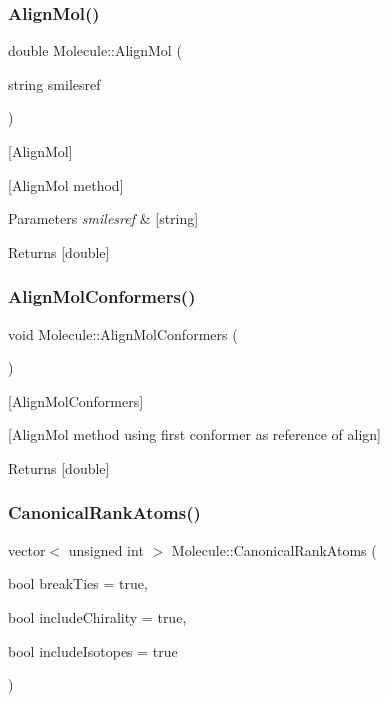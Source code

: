 \subsubsection{\texorpdfstring{Align\+Mol()}{AlignMol()}}
{\footnotesize\ttfamily double Molecule\+::\+Align\+Mol (\begin{DoxyParamCaption}\item[{string}]{smilesref }\end{DoxyParamCaption})}



\mbox{[}Align\+Mol\mbox{]} 

\mbox{[}Align\+Mol method\mbox{]}


\begin{DoxyParams}{Parameters}
{\em smilesref} & \mbox{[}string\mbox{]} \\
\hline
\end{DoxyParams}
\begin{DoxyReturn}{Returns}
\mbox{[}double\mbox{]} 
\end{DoxyReturn}
\mbox{\label{class_molecule_adc6886a60ec1e7f55ba07d7f2be72e68}} 
\subsubsection{\texorpdfstring{Align\+Mol\+Conformers()}{AlignMolConformers()}}
{\footnotesize\ttfamily void Molecule\+::\+Align\+Mol\+Conformers (\begin{DoxyParamCaption}{ }\end{DoxyParamCaption})}



\mbox{[}Align\+Mol\+Conformers\mbox{]} 

\mbox{[}Align\+Mol method using first conformer as reference of align\mbox{]}

\begin{DoxyReturn}{Returns}
\mbox{[}double\mbox{]} 
\end{DoxyReturn}
\mbox{\label{class_molecule_abc491241d48487fac42166ff81c0289c}} 
\subsubsection{\texorpdfstring{Canonical\+Rank\+Atoms()}{CanonicalRankAtoms()}}
{\footnotesize\ttfamily vector$<$ unsigned int $>$ Molecule\+::\+Canonical\+Rank\+Atoms (\begin{DoxyParamCaption}\item[{bool}]{break\+Ties = {\ttfamily true},  }\item[{bool}]{include\+Chirality = {\ttfamily true},  }\item[{bool}]{include\+Isotopes = {\ttfamily true} }\end{DoxyParamCaption})}



